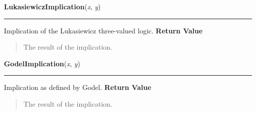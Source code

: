     \label{peach:fuzzy:norms:LukasiewiczImplication}

    \vspace{0.5ex}

\hspace{.8\funcindent}\begin{boxedminipage}{\funcwidth}

    \raggedright \textbf{LukasiewiczImplication}(\textit{x}, \textit{y})

    \vspace{-1.5ex}

    \rule{\textwidth}{0.5\fboxrule}
\setlength{\parskip}{2ex}

Implication of the Lukasiewicz three-valued logic.
\setlength{\parskip}{1ex}
      \textbf{Return Value}
    \vspace{-1ex}

      \begin{quote}

The result of the implication.
      \end{quote}

    \end{boxedminipage}

    \label{peach:fuzzy:norms:GodelImplication}

    \vspace{0.5ex}

\hspace{.8\funcindent}\begin{boxedminipage}{\funcwidth}

    \raggedright \textbf{GodelImplication}(\textit{x}, \textit{y})

    \vspace{-1.5ex}

    \rule{\textwidth}{0.5\fboxrule}
\setlength{\parskip}{2ex}

Implication as defined by Godel.
\setlength{\parskip}{1ex}
      \textbf{Return Value}
    \vspace{-1ex}

      \begin{quote}

The result of the implication.
      \end{quote}

    \end{boxedminipage}


